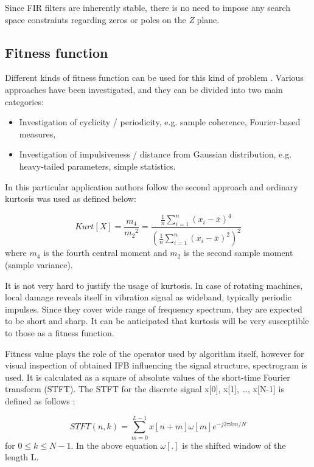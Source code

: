 \documentclass[preprint,12pt]{elsarticle}
\begin{document}
Since FIR filters are inherently stable, there is no need to impose any search space constraints regarding zeros or poles on the \emph{Z} plane.

\subsection{Fitness function}

Different kinds of fitness function can be used for this kind of problem \cite{mitchell1998introduction}. Various approaches have been investigated, and they can be divided into two main categories:

\begin{itemize}
    \item Investigation of cyclicity / periodicity, e.g. sample coherence, Fourier-based measures,
    \item Investigation of impulsiveness / distance from Gaussian distribution, e.g. heavy-tailed parameters, simple statistics.
\end{itemize}

In this particular application authors follow the second approach and ordinary kurtosis was used as defined below:

\begin{equation}
\label{eq:kurtosis}
Kurt[X]=\frac{m_4}{{m_2}^2}=\frac{\frac{1}{n} \sum_{i=1}^{n} \left(x_i - \overline{x} \right)^4}{\left({\frac{1}{n} \sum_{i=1}^{n} \left(x_i - \overline{x} \right)^2}\right)^2}
\end{equation}
where $m_4$ is the fourth central moment and $m_2$ is the second sample moment (sample variance).

It is not very hard to justify the usage of kurtosis. In case of rotating machines, local damage reveals itself in vibration signal as wideband, typically periodic impulses. Since they cover wide range of frequency spectrum, they are expected to be short and sharp. It can be anticipated that kurtosis will be very susceptible to those as a fitness function.

Fitness value plays the role of  the operator used by algorithm itself, however for visual inspection of obtained IFB influencing the signal structure, spectrogram is used. It is calculated as a square of absolute values of the short-time Fourier transform (STFT). The STFT for the discrete signal x[0], x[1], \dots , x[N-1] is defined as follows \cite{oppenheim1999discrete}:

\begin{equation}
\label{eq:spectrogram}
STFT(n,k)=\sum_{m=0}^{L-1} x[n+m]\omega[m]e^{-j2\pi km/N}
\end{equation}
for $0\leq k\leq N-1$. In the above equation $\omega[.]$ is the shifted window of the length L.
\end{document}
